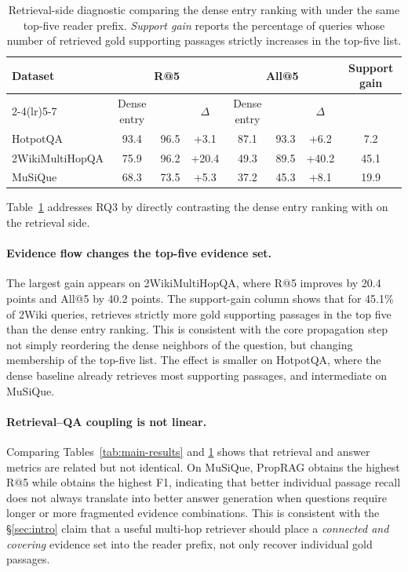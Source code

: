 \begin{table}[t]
\centering
\small
\setlength{\tabcolsep}{4pt}
\begin{tabular}{lccc ccc c}
\toprule
Dataset & \multicolumn{3}{c}{R@5} &
\multicolumn{3}{c}{All@5} &
Support gain \\
\cmidrule(lr){2-4}\cmidrule(lr){5-7}
& Dense entry & \methodname{} & $\Delta$ &
Dense entry & \methodname{} & $\Delta$ & \\
\midrule
HotpotQA & 93.4 & 96.5 & +3.1 & 87.1 & 93.3 & +6.2 & 7.2 \\
2WikiMultiHopQA & 75.9 & 96.2 & +20.4 & 49.3 & 89.5 & +40.2 & 45.1 \\
MuSiQue & 68.3 & 73.5 & +5.3 & 37.2 & 45.3 & +8.1 & 19.9 \\
\bottomrule
\end{tabular}
\caption{Retrieval-side diagnostic comparing the dense entry ranking
with \methodname{} under the same top-five reader prefix.
\emph{Support gain} reports the percentage of queries whose number of
retrieved gold supporting passages strictly increases in the top-five
list.}
\label{tab:flow-diagnostic}
\end{table}

Table~\ref{tab:flow-diagnostic} addresses RQ3 by directly contrasting
the dense entry ranking with \methodname{} on the retrieval side.
\paragraph{Evidence flow changes the top-five evidence set.}
The largest gain appears on 2WikiMultiHopQA, where R@5 improves by
20.4 points and All@5 by 40.2 points. The support-gain column shows
that for 45.1\% of 2Wiki queries, \methodname{} retrieves strictly
more gold supporting passages in the top five than the dense entry
ranking. This is consistent with the core propagation step not simply
reordering the dense neighbors of the question, but changing
membership of the top-five list. The effect is smaller on HotpotQA,
where the dense baseline already retrieves most supporting passages,
and intermediate on MuSiQue.

\paragraph{Retrieval--QA coupling is not linear.}
Comparing Tables~\ref{tab:main-results} and \ref{tab:flow-diagnostic}
shows that retrieval and answer metrics are related but not identical.
On MuSiQue, PropRAG obtains the highest R@5 while \methodname{} obtains
the highest F1, indicating that better individual passage recall does
not always translate into better answer generation when questions
require longer or more fragmented evidence combinations. This is
consistent with the \S\ref{sec:intro} claim that a useful multi-hop
retriever should place a \emph{connected and covering} evidence set
into the reader prefix, not only recover individual gold passages.

